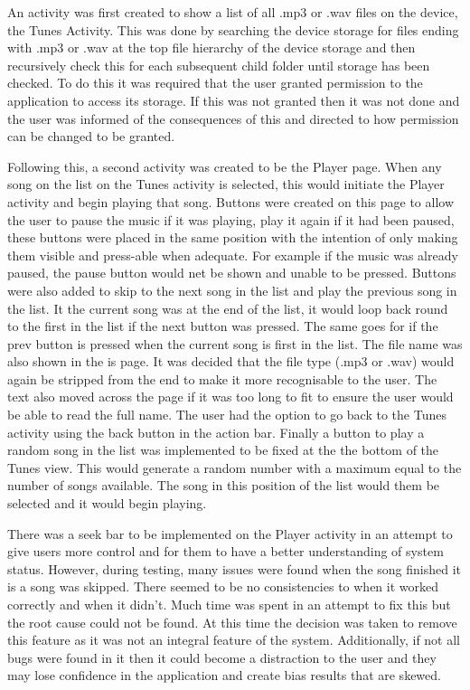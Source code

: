 \documentclass{l4proj}
\begin{document}
An activity was first created to show a list of all .mp3 or .wav files on the device, the Tunes Activity. This was done by searching the device storage for files ending with .mp3 or .wav  at the top file hierarchy of the device storage and then recursively check this for each subsequent child folder until storage has been checked. To do this it was required that the user granted permission to the application to access its storage. If this was not granted then it was not done and the user was informed of the consequences of this and directed to how permission can be changed to be granted.

Following this, a second activity was created to be the Player page. When any song on the list on the Tunes activity is selected, this would initiate the Player activity and begin playing that song. Buttons were created on this page to allow the user to pause the music if it was playing, play it again if it had been paused, these buttons were placed in the same position with the intention of only making them visible and press-able when adequate. For example if the music was already paused, the pause button would net be shown and unable to be pressed. Buttons were also added to skip to the next song in the list and play the previous song in the list. It the current song was at the end of the list, it would loop back round to the first in the list if the next button was pressed. The same goes for if the prev button is pressed when the current song is first in the list. The file name was also shown in the is page. It was decided that the file type (.mp3 or .wav) would again be stripped from the end to make it more recognisable to the user. The text also moved across the page if it was too long to fit to ensure the user would be able to read the full name. The user had the option to go back to the Tunes activity using the back button in the action bar. Finally a button to play a random song in the list was implemented to be fixed at the the bottom of the Tunes view. This would generate a random number with a maximum equal to the number of songs available. The song in this position of the list would them be selected and it would begin playing. 

There was a seek bar to be implemented on the Player activity in an attempt to give users more control and for them to have a better understanding of system status. However, during testing, many issues were found when the song finished it is a song was skipped. There seemed to be no consistencies to when it worked correctly and when it didn't. Much time was spent in an attempt to fix this but the root cause could not be found. At this time the decision was taken to remove this feature as it was not an integral feature of the system. Additionally, if not all bugs were found in it then it could become a distraction to the user and they may lose confidence in the application and create bias results that are skewed.
\end{document}
